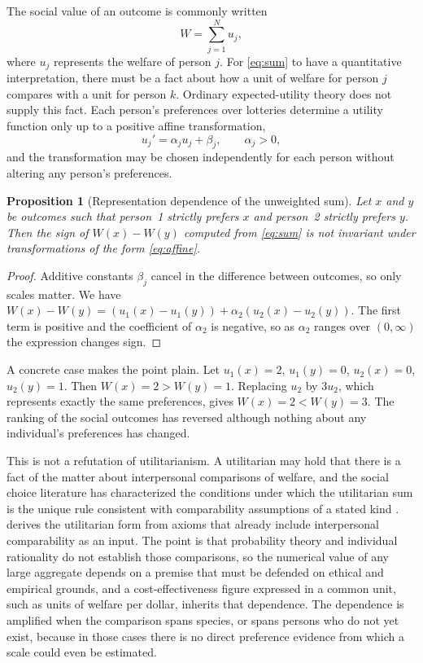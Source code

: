 \documentclass[11pt]{article}
\newtheorem{proposition}{Proposition}
\theoremstyle{definition}
\theoremstyle{remark}
\begin{document}
The social value of an outcome is commonly written
\begin{equation}
W=\sum_{j=1}^{N}u_j,
\label{eq:sum}
\end{equation}
where $u_j$ represents the welfare of person $j$. For \eqref{eq:sum} to have a quantitative interpretation, there must be a fact about how a unit of welfare for person $j$ compares with a unit for person $k$. Ordinary expected-utility theory does not supply this fact. Each person's preferences over lotteries determine a utility function only up to a positive affine transformation,
\begin{equation}
u_j'=\alpha_j u_j+\beta_j,\qquad \alpha_j>0,
\label{eq:affine}
\end{equation}
and the transformation may be chosen independently for each person without altering any person's preferences.

\begin{proposition}[Representation dependence of the unweighted sum]
\label{prop:rep}
Let $x$ and $y$ be outcomes such that person~1 strictly prefers $x$ and person~2 strictly prefers $y$. Then the sign of $W(x)-W(y)$ computed from \eqref{eq:sum} is not invariant under transformations of the form \eqref{eq:affine}.
\end{proposition}

\begin{proof}
Additive constants $\beta_j$ cancel in the difference between outcomes, so only scales matter. We have $W(x)-W(y)=(u_1(x)-u_1(y))+\alpha_2(u_2(x)-u_2(y))$. The first term is positive and the coefficient of $\alpha_2$ is negative, so as $\alpha_2$ ranges over $(0,\infty)$ the expression changes sign.
\end{proof}

A concrete case makes the point plain. Let $u_1(x)=2$, $u_1(y)=0$, $u_2(x)=0$, $u_2(y)=1$. Then $W(x)=2>W(y)=1$. Replacing $u_2$ by $3u_2$, which represents exactly the same preferences, gives $W(x)=2<W(y)=3$. The ranking of the social outcomes has reversed although nothing about any individual's preferences has changed.

This is not a refutation of utilitarianism. A utilitarian may hold that there is a fact of the matter about interpersonal comparisons of welfare, and the social choice literature has characterized the conditions under which the utilitarian sum is the unique rule consistent with comparability assumptions of a stated kind \citep{sen1970,dasp1977}. \citet{harsanyi1955} derives the utilitarian form from axioms that already include interpersonal comparability as an input. The point is that probability theory and individual rationality do not establish those comparisons, so the numerical value of any large aggregate depends on a premise that must be defended on ethical and empirical grounds, and a cost-effectiveness figure expressed in a common unit, such as units of welfare per dollar, inherits that dependence. The dependence is amplified when the comparison spans species, or spans persons who do not yet exist, because in those cases there is no direct preference evidence from which a scale could even be estimated.
\end{document}
